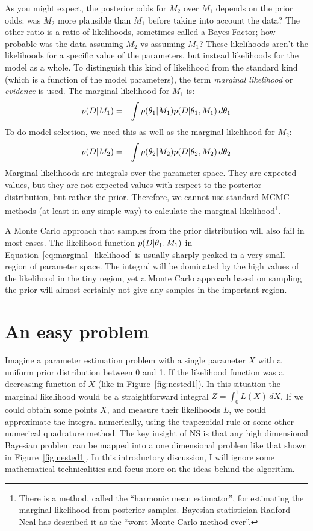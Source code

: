 As you might expect, the posterior odds for $M_2$ over $M_1$ depends on the
prior odds: was $M_2$ more plausible than $M_1$ before taking into account the
data? The other ratio is a ratio of likelihoods, sometimes called a Bayes Factor; how probable was the data
assuming $M_2$ vs assuming $M_1$? These likelihoods aren't the likelihoods
for a specific value of the parameters, but instead likelihoods for the model
as a whole. To distinguish this kind of likelihood from the standard kind (which
is a function of the model parameters), the term {\it marginal likelihood} or
{\it evidence} is used. The marginal likelihood for $M_1$ is:
\begin{eqnarray}
p(D | M_1) &=& \int p(\theta_1 | M_1) p(D | \theta_1, M_1) \, d\theta_1
\label{eq:marginal_likelihood}
\end{eqnarray}
To do model selection, we need this as well as the marginal likelihood for
$M_2$:
\begin{eqnarray}
p(D | M_2) &=& \int p(\theta_2 | M_2) p(D | \theta_2, M_2) \, d\theta_2
\end{eqnarray}
Marginal likelihoods are integrals over the parameter space. They are
expected values, but they are not expected values with respect to the posterior
distribution, but rather the prior. Therefore, we cannot use standard MCMC
methods (at least in any simple way) to calculate the marginal
likelihood\footnote{There is a method, called the ``harmonic mean estimator'',
for estimating the marginal likelihood from posterior samples. Bayesian
statistician Radford Neal has described it as the
``worst Monte Carlo method ever''.}.

A Monte Carlo approach that samples from the prior distribution will also fail
in most cases. The likelihood function $p(D | \theta_1, M_1)$ in
Equation~\ref{eq:marginal_likelihood} is usually sharply peaked in a very
small region of parameter space. The integral will be dominated by the high values
of the likelihood in the tiny region, yet a Monte Carlo approach based on
sampling the prior will almost certainly not give any samples in the important
region.

\section{An easy problem}
Imagine a parameter estimation problem with a single parameter $X$ with a
uniform prior distribution between 0 and 1. If the likelihood function was a
decreasing function of $X$ (like in Figure~\ref{fig:nested1}). In this
situation the marginal likelihood would be a straightforward integral
$Z = \int_0^1 L(X) \,dX$. If we could obtain some points $X$, and measure their
likelihoods $L$, we could approximate the integral numerically, using the
trapezoidal rule or some other numerical quadrature method.
The key insight of NS is that any high dimensional Bayesian
problem can be mapped into a one dimensional problem like that shown in
Figure~\ref{fig:nested1}. In this introductory discussion, I will ignore some
mathematical technicalities and focus more on the ideas behind the algorithm.

